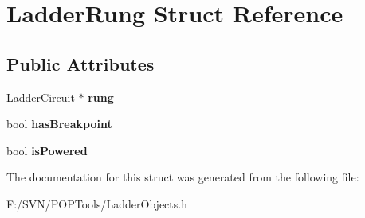 \hypertarget{struct_ladder_rung}{\section{Ladder\-Rung Struct Reference}
\label{struct_ladder_rung}
}
\subsection*{Public Attributes}
\begin{DoxyCompactItemize}
\item 
\hypertarget{struct_ladder_rung_a9050c4cc000d5458a13e12533e8aaf90}{\hyperlink{class_ladder_circuit}{Ladder\-Circuit} $\ast$ {\bfseries rung}}\label{struct_ladder_rung_a9050c4cc000d5458a13e12533e8aaf90}

\item 
\hypertarget{struct_ladder_rung_a5e5247514a6922eef4eb3259dc442df9}{bool {\bfseries has\-Breakpoint}}\label{struct_ladder_rung_a5e5247514a6922eef4eb3259dc442df9}

\item 
\hypertarget{struct_ladder_rung_ad2710ea546e96fb7dfdb1044f070d14b}{bool {\bfseries is\-Powered}}\label{struct_ladder_rung_ad2710ea546e96fb7dfdb1044f070d14b}

\end{DoxyCompactItemize}


The documentation for this struct was generated from the following file\-:\begin{DoxyCompactItemize}
\item 
F\-:/\-S\-V\-N/\-P\-O\-P\-Tools/Ladder\-Objects.\-h\end{DoxyCompactItemize}
